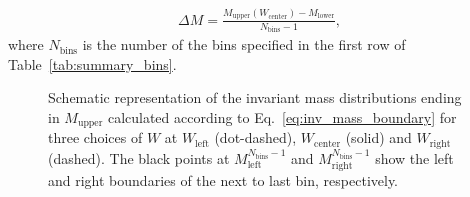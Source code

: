 \documentclass[prc,twocolumn,superscriptaddress,showpacs,amssymb,amsmath,amsfonts,aps,nofootinbib]{revtex4-1}
\begin{document}
\begin{equation}
\begin{aligned}
\Delta M = \frac{M_{\text{upper}}(W_{\text{center}})-M_{\text{lower}}}{N_{\text{bins}}-1}, \label{eq:bin_width}
\end{aligned}  
\end{equation} 
where $N_{\text{bins}}$ is the number of the bins specified in the first row of Table~\ref{tab:summary_bins}. 




\begin{figure}[htp]
\begin{center}
\caption{\small Schematic representation of the invariant mass distributions ending in 
 $M_{\text{upper}}$ calculated according to Eq.~\eqref{eq:inv_mass_boundary} for three 
choices of $W$ at $W_{\text{left}}$ (dot-dashed), $W_{\text{center}}$ (solid) and 
$W_{\text{right}}$ (dashed).
The black points at $M_{\text{left}}^{N_{\text{bins}}-1}$ and $M_{\text{right}}^{N_{\text{bins}}-1}$ show the left and right boundaries of the next to last bin, respectively.
\label{fig:mass_corr}}
\end{center}
\end{figure}
\end{document}
